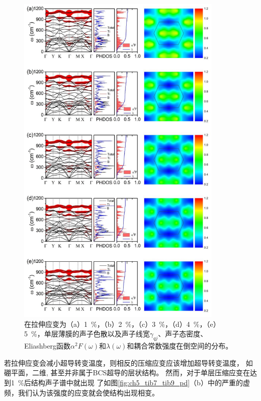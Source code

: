 \begin{figure}
  \includegraphics[width=0.88\textwidth]{figs/ch5_details_strains.png}
  \centering
  \caption{在拉伸应变为（a）\SI{1}{\percent}，（b）\SI{2}{\percent}，（c）\SI{3}{\percent}，（d）\SI{4}{\percent}，（e）\SI{5}{\percent}，单层薄膜的声子色散以及声子线宽$\gamma_{qj}$、声子态密度、
  Eliashberg函数$\alpha^2 F(\omega)$和$\lambda(\omega)$和耦合常数强度在倒空间的分布。}
  \label{fig:ch5_details_strains}
\end{figure}

若拉伸应变会减小超导转变温度，则相反的压缩应变应该增加超导转变温度，
如硼平面\cite{cheng2017suppressed}，二维\cite{liao2020doping},
甚至并非属于BCS超导的层状结构\cite{nie2009suppression}。
然而，对于单层压缩应变在达到\SI{1}{\percent}后结构声子谱中就出现
了如图\ref{fig:ch5_tib7_tib9_pd}（b）中的严重的虚频，我们认为该强度的应变就会使结构出现相变。

